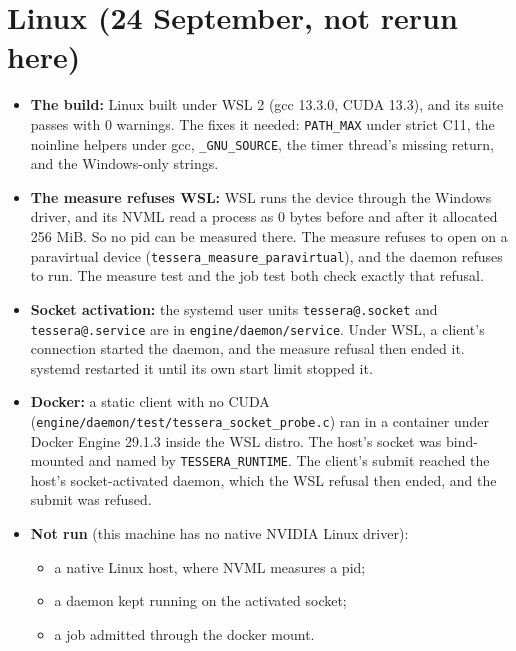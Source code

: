 \section{\texorpdfstring{Linux (24 September, not rerun here)}{Linux (24 September, not rerun here)}}

\begin{itemize}
\item \textbf{The build:} Linux built under WSL 2 (gcc 13.3.0, CUDA 13.3), and its suite passes with 0 warnings. The fixes it needed: \texttt{PATH\_\allowbreak{}MAX} under strict C11, the noinline helpers under gcc, \texttt{\_\allowbreak{}GNU\_\allowbreak{}SOURCE}, the timer thread's missing return, and the Windows-only strings.
\item \textbf{The measure refuses WSL:} WSL runs the device through the Windows driver, and its NVML read a process as 0 bytes before and after it allocated 256 MiB. So no pid can be measured there. The measure refuses to open on a paravirtual device (\texttt{tessera\_\allowbreak{}measure\_\allowbreak{}paravirtual}), and the daemon refuses to run. The measure test and the job test both check exactly that refusal.
\item \textbf{Socket activation:} the systemd user units \texttt{tessera@.\allowbreak{}socket} and \texttt{tessera@.\allowbreak{}service} are in \texttt{engine/\allowbreak{}daemon/\allowbreak{}service}. Under WSL, a client's connection started the daemon, and the measure refusal then ended it. systemd restarted it until its own start limit stopped it.
\item \textbf{Docker:} a static client with no CUDA (\texttt{engine/\allowbreak{}daemon/\allowbreak{}test/\allowbreak{}tessera\_\allowbreak{}socket\_\allowbreak{}probe.\allowbreak{}c}) ran in a container under Docker Engine 29.1.3 inside the WSL distro. The host's socket was bind-mounted and named by \texttt{TESSERA\_\allowbreak{}RUNTIME}. The client's submit reached the host's socket-activated daemon, which the WSL refusal then ended, and the submit was refused.
\item \textbf{Not run} (this machine has no native NVIDIA Linux driver):

\begin{itemize}
\item a native Linux host, where NVML measures a pid;
\item a daemon kept running on the activated socket;
\item a job admitted through the docker mount.
\end{itemize}
\end{itemize}
